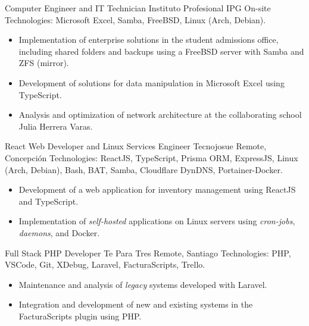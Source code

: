 \documentclass[12pt,letterpaper,sans]{moderncv}
\begin{document}
{Computer Engineer and IT Technician}
{Instituto Profesional IPG}
{\newline On-site}
{\newline Technologies: Microsoft Excel, Samba, FreeBSD, Linux (Arch, Debian).}
{
  \begin{itemize}
    \item Implementation of enterprise solutions in the student admissions office, including shared folders and backups using a FreeBSD server with Samba and ZFS (mirror).
    \item Development of solutions for data manipulation in Microsoft Excel using TypeScript.
    \item Analysis and optimization of network architecture at the collaborating school Julia Herrera Varas.
  \end{itemize}
}
\vspace{0.5em}

{React Web Developer and Linux Services Engineer}
{Tecnojosue}
{\newline Remote, Concepción}
{\newline Technologies: ReactJS, TypeScript, Prisma ORM, ExpressJS, Linux (Arch, Debian), Bash, BAT, Samba, Cloudflare DynDNS, Portainer-Docker.}
{
  \begin{itemize}
    \item Development of a web application for inventory management using ReactJS and TypeScript.
    \item Implementation of \textit{self-hosted} applications on Linux servers using \textit{cron-jobs}, \textit{daemons}, and Docker.
  \end{itemize}
}
\vspace{0.5em}

{Full Stack PHP Developer}
{Te Para Tres}
{\newline Remote, Santiago}
{\newline Technologies: PHP, VSCode, Git, XDebug, Laravel, FacturaScripts, Trello.}
{
  \begin{itemize}
    \item Maintenance and analysis of \textit{legacy} systems developed with Laravel.
    \item Integration and development of new and existing systems in the FacturaScripts plugin using PHP.
  \end{itemize}
}
\vspace{0.5em}
\end{document}
